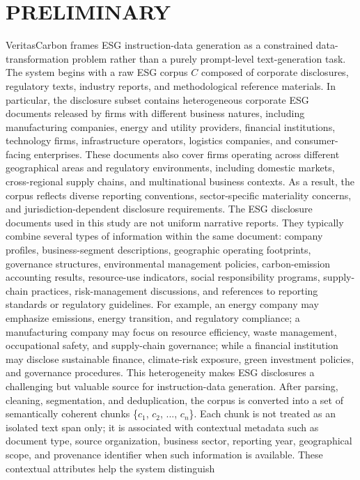 \documentclass[9pt,twocolumn]{extarticle}
\begin{document}
\section{PRELIMINARY}
VeritasCarbon frames ESG instruction-data generation as a constrained
data-transformation problem rather than a purely prompt-level
text-generation task. The system begins with a raw ESG corpus \(C\)
composed of corporate disclosures, regulatory texts, industry reports,
and methodological reference materials. In particular, the disclosure
subset contains heterogeneous corporate ESG documents released by firms
with different business natures, including manufacturing companies,
energy and utility providers, financial institutions, technology firms,
infrastructure operators, logistics companies, and consumer-facing
enterprises. These documents also cover firms operating across different
geographical areas and regulatory environments, including domestic
markets, cross-regional supply chains, and multinational business
contexts. As a result, the corpus reflects diverse reporting
conventions, sector-specific materiality concerns, and
jurisdiction-dependent disclosure requirements.
The ESG disclosure documents used in this study are not uniform
narrative reports. They typically combine several types of information
within the same document: company profiles, business-segment
descriptions, geographic operating footprints, governance structures,
environmental management policies, carbon-emission accounting results,
resource-use indicators, social responsibility programs, supply-chain
practices, risk-management discussions, and references to reporting
standards or regulatory guidelines. For example, an energy company may
emphasize emissions, energy transition, and regulatory compliance; a
manufacturing company may focus on resource efficiency, waste
management, occupational safety, and supply-chain governance; while a
financial institution may disclose sustainable finance, climate-risk
exposure, green investment policies, and governance procedures. This
heterogeneity makes ESG disclosures a challenging but valuable source
for instruction-data generation.
After parsing, cleaning, segmentation, and deduplication, the corpus is
converted into a set of semantically coherent chunks \{\(c_{1}\),
\(c_{2}\), ..., \(c_{n}\)\}. Each chunk is not treated as an isolated
text span only; it is associated with contextual metadata such as
document type, source organization, business sector, reporting year,
geographical scope, and provenance identifier when such information is
available. These contextual attributes help the system distinguish
\end{document}
